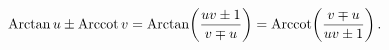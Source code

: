 \[\mathop{\mathrm{Arctan}\/}\nolimits u\pm\mathop{\mathrm{Arccot}\/}\nolimits v=%
\mathop{\mathrm{Arctan}\/}\nolimits\!\left(\frac{uv\pm 1}{v\mp u}\right)=%
\mathop{\mathrm{Arccot}\/}\nolimits\!\left(\frac{v\mp u}{uv\pm 1}\right).\]